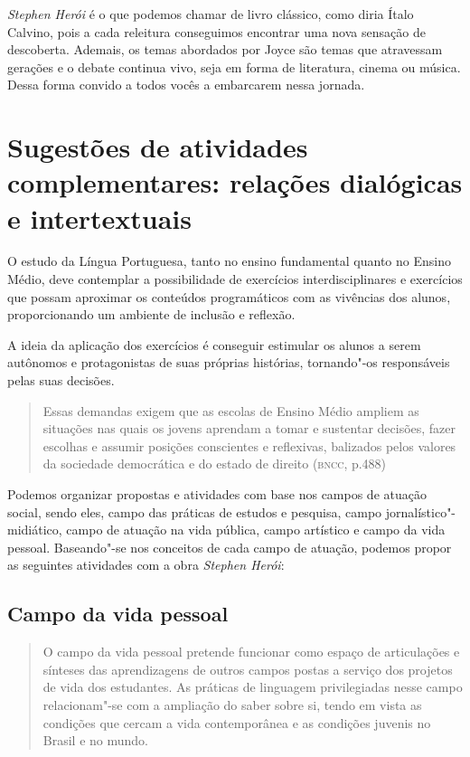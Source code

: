 \documentclass[12pt]{extarticle}
\begin{document}
{\emph{Stephen Herói} é o que podemos chamar de livro clássico, como
diria Ítalo Calvino, pois a cada releitura conseguimos encontrar uma
nova sensação de descoberta. Ademais, os temas abordados por Joyce são
temas que atravessam gerações e o debate continua vivo, seja em forma de
literatura, cinema ou música. Dessa forma convido a todos vocês a
embarcarem nessa jornada.

\section{Sugestões de atividades complementares: relações dialógicas e
intertextuais}


O estudo da Língua Portuguesa, tanto no ensino fundamental quanto no
Ensino Médio, deve contemplar a possibilidade de exercícios
interdisciplinares e exercícios que possam aproximar os conteúdos
programáticos com as vivências dos alunos, proporcionando um ambiente de
inclusão e reflexão.

A ideia da aplicação dos exercícios é conseguir estimular os alunos a
serem autônomos e protagonistas de suas próprias histórias, tornando"-os
responsáveis pelas suas decisões.

\begin{quote}
Essas demandas exigem que as escolas de Ensino Médio ampliem as
situações nas quais os jovens aprendam a tomar e sustentar decisões,
fazer escolhas e assumir posições conscientes e reflexivas, balizados
pelos valores da sociedade democrática e do estado de direito (\textsc{bncc}, p.488)
\end{quote}

Podemos organizar propostas e atividades com base nos campos de atuação
social, sendo eles, campo das práticas de estudos e pesquisa, campo
jornalístico"-midiático, campo de atuação na vida pública, campo
artístico e campo da vida pessoal. Baseando"-se nos conceitos de cada
campo de atuação, podemos propor as seguintes atividades com a obra
\emph{Stephen Herói}:

\subsection{Campo da vida pessoal}

\begin{quote}
O campo da vida pessoal pretende funcionar como espaço de articulações
e sínteses das aprendizagens de outros campos postas a serviço dos
projetos de vida dos estudantes. As práticas de linguagem privilegiadas
nesse campo relacionam"-se com a ampliação do saber sobre si, tendo em
vista as condições que cercam a vida contemporânea e as condições
juvenis no Brasil e no mundo.


\end{quote}}
\end{document}
